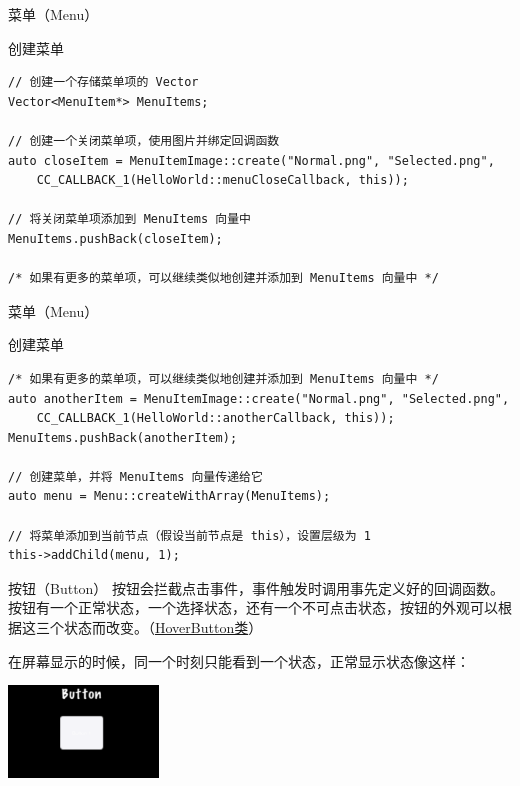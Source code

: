 \documentclass{beamer}
\newcommand{\hrefcol}[2]{\textcolor{cyan}{\href{#1}{#2}}}
\begin{document}

\begin{frame}[fragile]{菜单（Menu）}
\begin{block}{创建菜单}
\begin{verbatim}
// 创建一个存储菜单项的 Vector
Vector<MenuItem*> MenuItems;

// 创建一个关闭菜单项，使用图片并绑定回调函数
auto closeItem = MenuItemImage::create("Normal.png", "Selected.png",
    CC_CALLBACK_1(HelloWorld::menuCloseCallback, this));

// 将关闭菜单项添加到 MenuItems 向量中
MenuItems.pushBack(closeItem);

/* 如果有更多的菜单项，可以继续类似地创建并添加到 MenuItems 向量中 */
\end{verbatim}
\end{block}
\end{frame}


\begin{frame}[fragile]{菜单（Menu）}
\begin{block}{创建菜单}
\begin{verbatim}
/* 如果有更多的菜单项，可以继续类似地创建并添加到 MenuItems 向量中 */
auto anotherItem = MenuItemImage::create("Normal.png", "Selected.png",
    CC_CALLBACK_1(HelloWorld::anotherCallback, this));
MenuItems.pushBack(anotherItem);

// 创建菜单，并将 MenuItems 向量传递给它
auto menu = Menu::createWithArray(MenuItems);

// 将菜单添加到当前节点（假设当前节点是 this），设置层级为 1
this->addChild(menu, 1);
\end{verbatim}
\end{block}
\end{frame}


\begin{frame}[fragile]{按钮（Button）}
按钮会拦截点击事件，事件触发时调用事先定义好的回调函数。按钮有一个正常状态，一个选择状态，还有一个不可点击状态，按钮的外观可以根据这三个状态而改变。（\hrefcol{https://github.com/MinmusLin/Teamfight_Tactics/blob/main/src/Classes/Button}{HoverButton类}）

\vspace{1em}

在屏幕显示的时候，同一个时刻只能看到一个状态，正常显示状态像这样：

\vspace{1em}

\includegraphics[width=0.3\textwidth]
{figures/button}
\end{frame}
\end{document}
